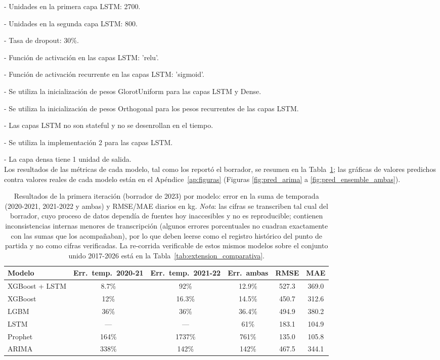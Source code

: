 - Unidades en la primera capa LSTM: 2700.

- Unidades en la segunda capa LSTM: 800.

- Tasa de dropout: 30\%.

- Función de activación en las capas LSTM: 'relu'.

- Función de activación recurrente en las capas LSTM: 'sigmoid'.

- Se utiliza la inicialización de pesos GlorotUniform para las capas LSTM y Dense.

- Se utiliza la inicialización de pesos Orthogonal para los pesos recurrentes de las capas LSTM.

- Las capas LSTM no son stateful y no se desenrollan en el tiempo.

- Se utiliza la implementación 2 para las capas LSTM.

- La capa densa tiene 1 unidad de salida.\\

Los resultados de las métricas de cada modelo, tal como los reportó el borrador, se resumen en la Tabla~\ref{tab:metricas_borrador}; las gráficas de valores predichos contra valores reales de cada modelo están en el Apéndice~\ref{ap:figuras} (Figuras \ref{fig:pred_arima} a \ref{fig:pred_ensemble_ambas}).

\begin{table}[htbp]
\centering
\small
\begin{tabular}{lccccc}
\toprule
Modelo & Err.\ temp.\ 2020-21 & Err.\ temp.\ 2021-22 & Err.\ ambas & RMSE & MAE \\
\midrule
XGBoost + LSTM & 8.7\% & 92\% & 12.9\% & 527.3 & 369.0 \\
XGBoost & 12\% & 16.3\% & 14.5\% & 450.7 & 312.6 \\
LGBM & 36\% & 36\% & 36.4\% & 494.9 & 380.2 \\
\midrule
LSTM & --- & --- & 61\% & 183.1 & 104.9 \\
Prophet & 164\% & 1737\% & 761\% & 135.0 & 105.8 \\
ARIMA & 338\% & 142\% & 142\% & 467.5 & 344.1 \\
\bottomrule
\end{tabular}
\caption{Resultados de la primera iteración (borrador de 2023) por modelo: error en la suma de
temporada (2020-2021, 2021-2022 y ambas) y RMSE/MAE diarios en kg. \emph{Nota}: las cifras se
transcriben tal cual del borrador, cuyo proceso de datos dependía de fuentes hoy inaccesibles y
no es reproducible; contienen inconsistencias internas menores de transcripción (algunos errores
porcentuales no cuadran exactamente con las sumas que los acompañaban), por lo que deben leerse
como el registro histórico del punto de partida y no como cifras verificadas. La re-corrida
verificable de estos mismos modelos sobre el conjunto unido 2017-2026 está en la
Tabla~\ref{tab:extension_comparativa}.}
\label{tab:metricas_borrador}
\end{table}


